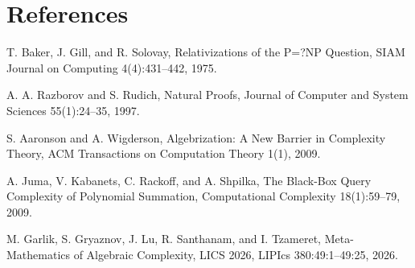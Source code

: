 \documentclass[11pt]{article}
\begin{document}
\section*{References}
T. Baker, J. Gill, and R. Solovay, Relativizations of the P=?NP Question, SIAM Journal on Computing 4(4):431--442, 1975.

A. A. Razborov and S. Rudich, Natural Proofs, Journal of Computer and System Sciences 55(1):24--35, 1997.

S. Aaronson and A. Wigderson, Algebrization: A New Barrier in Complexity Theory, ACM Transactions on Computation Theory 1(1), 2009.

A. Juma, V. Kabanets, C. Rackoff, and A. Shpilka, The Black-Box Query Complexity of Polynomial Summation, Computational Complexity 18(1):59--79, 2009.

M. Garlik, S. Gryaznov, J. Lu, R. Santhanam, and I. Tzameret, Meta-Mathematics of Algebraic Complexity, LICS 2026, LIPIcs 380:49:1--49:25, 2026.
\end{document}
